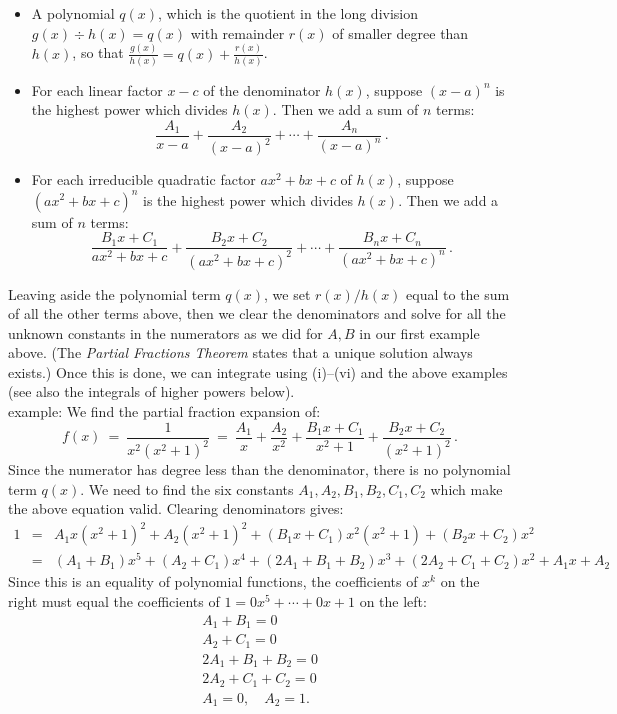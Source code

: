 \documentclass[11pt]{article}
\begin{document}
\begin{itemize}

\item A polynomial $q(x)$, which is the quotient in the long division $g(x)\div h(x) = q(x)$ with remainder $r(x)$ of smaller degree than $h(x)$,
so that $\frac{g(x)}{h(x)} = q(x) + \frac{r(x)}{h(x)}$. 

\item For each linear factor $x-c$ of the denominator $h(x)$, suppose $(x-a)^n$ is the highest 
power which divides $h(x)$. Then we add a sum of $n$ terms:
$$\frac{A_1}{x-a}+\frac{A_2}{(x-a)^2}+\cdots+\frac{A_n}{(x-a)^n}\,.$$

\item For each irreducible quadratic factor $ax^2 + bx+c$ of $h(x)$, 
suppose $(ax^2 + bx+c)^n$ is the highest power which divides $h(x)$. 
Then we add a sum of $n$ terms:
$$\frac{B_1x + C_1}{ax^2 + bx+c}+\frac{B_2x + C_2}{(ax^2 + bx+c)^2}
+\cdots+\frac{B_nx + C_n}{(ax^2 + bx+c)^n}\,.
$$

\end{itemize}
%
Leaving aside the polynomial term $q(x)$, we set $r(x)/h(x)$ equal to the sum of all the other terms above,
then we clear the denominators and solve for all the unknown constants in the numerators as 
we did for $A,B$ in our first example above. 
(The {\it Partial Fractions Theorem} states that a unique solution always exists.)
Once this is done, we can integrate using (i)--(vi) and the above examples (see also the integrals of higher powers below).
\\[.5em]
{\sc example:} 
We find the partial fraction expansion of: 
$$
 f(x) \ = \ \frac1{x^2(x^2+1)^2}
\ =\
\frac{A_1}{x} + \frac{A_2}{x^2} + \frac{B_1x{+}C_1}{x^2+1}+ \frac{B_2x{+}C_2}{(x^2+1)^2}\,.
$$
Since the numerator has degree less than the denominator, there is no polynomial term $q(x)$.
We need to find the six constants $A_1, A_2, B_1, B_2, C_1, C_2$ which make the above equation valid.
Clearing denominators gives:
$$\begin{array}{rcl}
1 &=& A_1x(x^2{+}1)^2 + A_2(x^2{+}1)^2 + (B_1x{+}C_1)x^2(x^2{+}1) + (B_2x{+}C_2)x^2 
\\
&=& 
(A_1{+}B_1)x^5+ (A_2{+}C_1)x^4 + (2 A_1{+}B_1{+}B_2)x^3+(2 A_2{+}C_1{+}C_2)x^2+A_1 x+ A_2
\end{array}$$
Since this is an equality of polynomial functions, the coefficients of $x^k$ on the right 
must equal the coefficients of $1 = 0x^5 + \cdots +0x +1$ on the left:
$$\begin{array}{c}
A_1+B_1 = 0
\\
 A_2+C_1=0
\\
 2 A_1+B_1+B_2 = 0
\\
 2 A_2+C_1+C_2 = 0
\\
A_1 = 0, \quad A_2=1.
\end{array}$$
\end{document}
